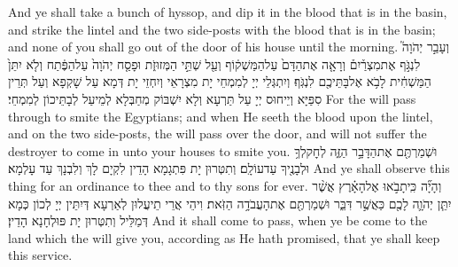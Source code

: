 {And ye shall take a bunch of hyssop, and dip it in the blood that is in the basin, and strike the lintel and the two side-posts with the blood that is in the basin; and none of you shall go out of the door of his house until the morning.}{}
{וְעָבַ֣ר יְהֹוָה֮ לִנְגֹּ֣ף אֶת\maqqaf מִצְרַ֒יִם֒ וְרָאָ֤ה אֶת\maqqaf הַדָּם֙ עַל\maqqaf הַמַּשְׁק֔וֹף וְעַ֖ל שְׁתֵּ֣י הַמְּזוּזֹ֑ת וּפָסַ֤ח יְהֹוָה֙ עַל\maqqaf הַפֶּ֔תַח וְלֹ֤א יִתֵּן֙ הַמַּשְׁחִ֔ית לָבֹ֥א אֶל\maqqaf בָּתֵּיכֶ֖ם לִנְגֹּֽף׃}
{וְיִתְגְּלֵי יְיָ לְמִמְחֵי יָת מִצְרָאֵי וְיִחְזֵי יָת דְּמָא עַל שָׁקְפָא וְעַל תְּרֵין סִפַּיָּא וְיֵיחוּס יְיָ עַל תַּרְעָא וְלָא יִשְׁבּוֹק מְחַבְּלָא לְמֵיעַל לְבָתֵּיכוֹן לְמִמְחֵי׃}
{For the \lord\space will pass through to smite the Egyptians; and when He seeth the blood upon the lintel, and on the two side-posts, the \lord\space will pass over the door, and will not suffer the destroyer to come in unto your houses to smite you.}{}
{וּשְׁמַרְתֶּ֖ם אֶת\maqqaf הַדָּבָ֣ר הַזֶּ֑ה לְחׇק\maqqaf לְךָ֥ וּלְבָנֶ֖יךָ עַד\maqqaf עוֹלָֽם׃}
{וְתִטְּרוּן יָת פִּתְגָמָא הָדֵין לִקְיָם לָךְ וְלִבְנָךְ עַד עָלְמָא׃}
{And ye shall observe this thing for an ordinance to thee and to thy sons for ever.}{}
{וְהָיָ֞ה כִּֽי\maqqaf תָבֹ֣אוּ אֶל\maqqaf הָאָ֗רֶץ אֲשֶׁ֨ר יִתֵּ֧ן יְהֹוָ֛ה לָכֶ֖ם כַּאֲשֶׁ֣ר דִּבֵּ֑ר וּשְׁמַרְתֶּ֖ם אֶת\maqqaf הָעֲבֹדָ֥ה הַזֹּֽאת׃}
{וִיהֵי אֲרֵי תֵיעֲלוּן לְאַרְעָא דְּיִתֵּין יְיָ לְכוֹן כְּמָא דְּמַלֵּיל וְתִטְּרוּן יָת פּוּלְחָנָא הָדֵין׃}
{And it shall come to pass, when ye be come to the land which the \lord\space will give you, according as He hath promised, that ye shall keep this service.}{}
